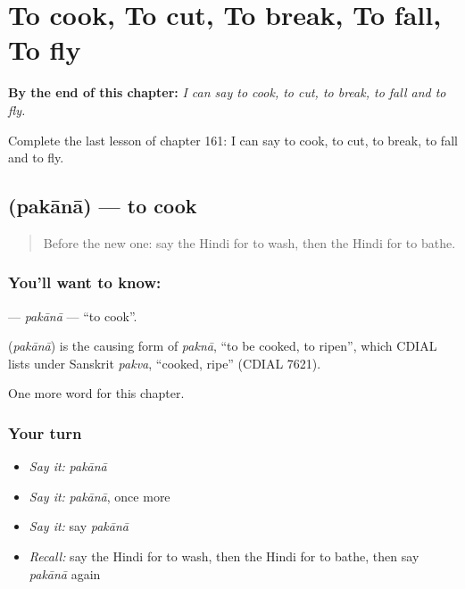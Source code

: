 
\chapter{To cook, To cut, To break, To fall, To fly}
\label{ch:hi-to-cook-to-cut-to-break-to-fall-to-fly}

\begin{chapteropening}
\textbf{By the end of this chapter:} \emph{I can say to cook, to cut, to break, to fall and to fly.}

Complete the last lesson of chapter 161: I can say to cook, to cut, to break, to fall and to fly.
\end{chapteropening}

\section[\texorpdfstring{\hi{पकाना} (pakānā)}{पकाना (pakānā)}]{ (pakānā) — to cook}

\label{lesson:HI-C161-pakana}



\begin{quote}
Before the new one: say the Hindi for to wash, then the Hindi for to bathe.
\end{quote}

\subsection*{You'll want to know: }
\textbf{} — \emph{pakānā} — \textquotedblleft{}to cook\textquotedblright{}.

\begin{cousinweb}
\textbf{} (\emph{pakānā}) is the causing form of \emph{paknā}, \textquotedblleft{}to be cooked, to ripen\textquotedblright{}, which CDIAL lists under Sanskrit \emph{pakva}, \textquotedblleft{}cooked, ripe\textquotedblright{} (CDIAL 7621).
\end{cousinweb}

\begin{grammarlens}[title={What you've built}]
One more word for this chapter.
\end{grammarlens}

\subsection*{Your turn}
\begin{itemize}
\raggedright
  \item \emph{Say it:} \emph{pakānā}
  \item \emph{Say it:} \emph{pakānā}, once more
  \item \emph{Say it:} say \emph{pakānā}
  \item \emph{Recall:} say the Hindi for to wash, then the Hindi for to bathe, then say \emph{pakānā} again
\end{itemize}

